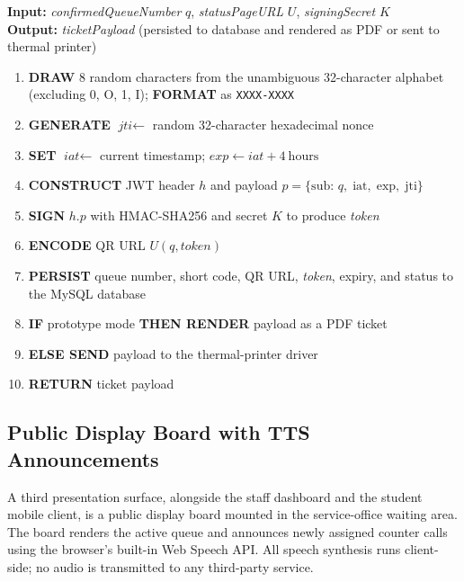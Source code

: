 \noindent\textbf{Input:} \textit{confirmedQueueNumber} $q$,
\textit{statusPageURL} $U$, \textit{signingSecret} $K$\\
\noindent\textbf{Output:} \textit{ticketPayload} (persisted to
database and rendered as PDF or sent to thermal printer)

\begin{enumerate}
  \item \textbf{DRAW} 8 random characters from the unambiguous
        32-character alphabet (excluding 0, O, 1, I);
        \textbf{FORMAT} as \texttt{XXXX-XXXX}
  \item \textbf{GENERATE} $\textit{jti} \gets$ random 32-character
        hexadecimal nonce
  \item \textbf{SET} $\textit{iat} \gets$ current timestamp;
        $\textit{exp} \gets \textit{iat} + 4\ \text{hours}$
  \item \textbf{CONSTRUCT} JWT header $h$ and payload
        $p = \{\mathrm{sub}{:}\,q,\;\mathrm{iat},\;\mathrm{exp},
        \;\mathrm{jti}\}$
  \item \textbf{SIGN} $h.p$ with HMAC-SHA256 and secret $K$ to
        produce \textit{token}
  \item \textbf{ENCODE} QR URL $U(q, \textit{token})$
  \item \textbf{PERSIST} queue number, short code, QR URL,
        \textit{token}, expiry, and status to the MySQL database
  \item \textbf{IF} prototype mode \textbf{THEN RENDER} payload as a
        PDF ticket
  \item \textbf{ELSE SEND} payload to the thermal-printer driver
  \item \textbf{RETURN} ticket payload
\end{enumerate}
\vspace{0.3em}

\subsection{Public Display Board with TTS Announcements}
\label{subsec:display-board}

A third presentation surface, alongside the staff dashboard and the
student mobile client, is a public display board mounted in the
service-office waiting area. The board renders the active queue and
announces newly assigned counter calls using the browser's built-in
Web Speech API. All speech synthesis runs client-side; no audio is
transmitted to any third-party service.

